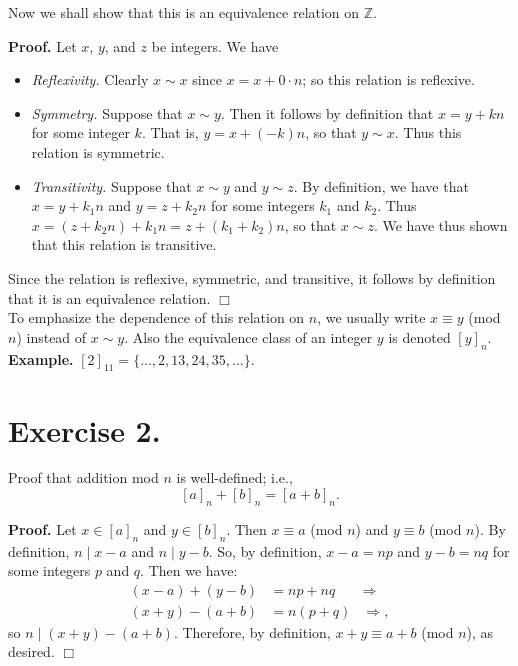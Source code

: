 \documentclass[9pt]{article}
\newcommand{\qed}{\hfill \ensuremath{\Box}}
\newcommand{\Z}{\mathbb{Z}}
\begin{document}
   Now we shall show that this is an equivalence relation on $\Z$.

   \textbf{Proof.} Let $x$, $y$, and $z$ be integers. We have
   \begin{itemize}
      \item \textit{Reflexivity.} Clearly $x \sim x$ since $x = x + 0\cdot n$;
            so this relation is reflexive.
      \item \textit{Symmetry.} Suppose that $x \sim y$. Then it follows by
            definition that $x = y + kn$ for some integer $k$. That is,
            $y = x + (-k)n$, so that $y \sim x$. Thus this relation is
            symmetric.
      \item \textit{Transitivity.} Suppose that $x \sim y$ and $y \sim z$. By
            definition, we have that $x = y + k_1n$ and $y = z + k_2n$ for some
            integers $k_1$ and $k_2$. Thus
            $x = (z + k_2n) + k_1n = z + (k_1 + k_2)n$, so that $x \sim z$. We
            have thus shown that this relation is transitive.
   \end{itemize}

   Since the relation is reflexive, symmetric, and transitive, it follows by
   definition that it is an equivalence relation. \qed \\

   To emphasize the dependence of this relation on $n$, we 
   usually write $x \equiv y$ (mod $n$) instead of $x \sim y$. Also the 
   equivalence class of an integer $y$ is denoted $[y]_n$. \\

   \textbf{Example.} $[2]_{11} = \{\ldots, 2, 13, 24, 35, \ldots\}$.

   \section*{Exercise 2.} Proof that addition mod $n$ is well-defined; i.e.,
   $$[a]_n + [b]_n = [a + b]_n.$$

   \textbf{Proof.} Let $x \in [a]_n$ and $y \in [b]_n$. Then
   $x \equiv a$ (mod $n$) and $y \equiv b$ (mod $n$). By definition,
   $n \mid x - a$ and $n \mid y - b$. So, by definition, $x - a = np$ and
   $y - b = nq$ for some integers $p$ and $q$. Then we have:
   \begin{align*}
      (x - a) + (y - b) &= np + nq &\Rightarrow \\
      (x + y) - (a + b) &= n(p + q) &\Rightarrow,
   \end{align*}
   so $n \mid (x + y) - (a + b)$. Therefore, by definition,
   $x + y \equiv a + b$ (mod $n$), as desired. \qed
\end{document}
